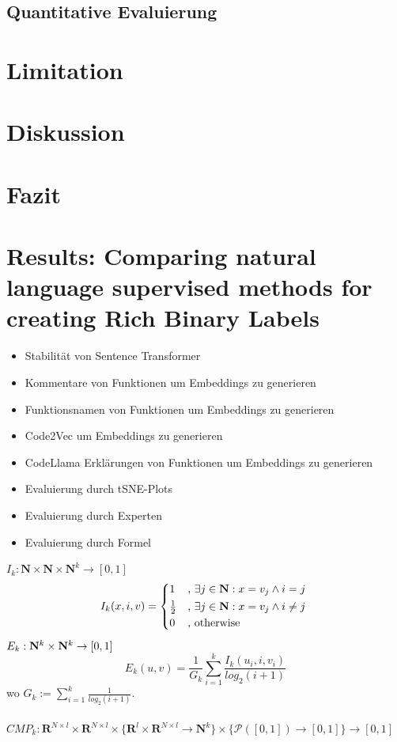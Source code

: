 \documentclass[12pt,letterpaper,ngerman]{article}
\begin{document}
\subsection{Quantitative Evaluierung} 
\section{Limitation}
\section{Diskussion}
\section{Fazit}
\section{Results: Comparing natural language supervised methods for creating Rich Binary Labels}
\begin{itemize}
  \item Stabilität von Sentence Transformer
  \item Kommentare von Funktionen um Embeddings zu generieren
  \item Funktionsnamen von Funktionen um Embeddings zu generieren
  \item Code2Vec um Embeddings zu generieren
  \item CodeLlama Erklärungen von Funktionen um Embeddings zu generieren
  \item Evaluierung durch tSNE-Plots
  \item Evaluierung durch Experten
  \item Evaluierung durch Formel
\end{itemize}
$ I_{k}: \mathbf{N} \times \mathbf{N} \times \mathbf{N}^{k} \to [0,1]$
\[ I_{k}(x,i,v) = \begin{cases*} 
      1 & , $\exists j \in \mathbf{N}: x = v_j \land i = j$  \\
      \frac{1}{2} & , $\exists j \in \mathbf{N}: x = v_j \land i \neq j$\\
      0   & , \text{otherwise}
                \end{cases*} \]
$E_k: \mathbf{N}^k \times \mathbf{N}^k \to [0,1]$
\[ E_k(u,v) = \frac{1}{G_k} \sum^{k}_{i=1} \frac{I_k(u_i,i,v_i)}{log_2(i+1)}\]
wo $G_k := \sum_{i=1}^{k} \frac{1}{log_2(i+1)}$.\\\\
$CMP_k: \mathbf{R}^{N\times l} \times \mathbf{R}^{N\times l} \times 
\{ \mathbf{R}^l \times \mathbf{R}^{N\times l} \to \mathbf{N}^k \} 
\times \{ \mathcal{P}([0,1]) \to [0,1] \} \to [0,1]$
\end{document}
